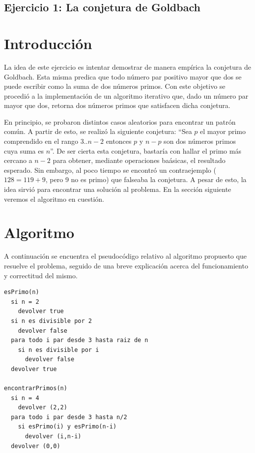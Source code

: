 \documentclass[a4paper,10pt] {article}
\begin{document}
\begin{center}
\section*{Ejercicio 1: La conjetura de Goldbach}
\end{center}

\bigskip
\section*{Introducci\'on}

La idea de este ejercicio es intentar demostrar de manera emp\'irica la
conjetura de Goldbach. Esta misma predica que todo n\'umero par positivo mayor
que dos se puede escribir como la suma de dos n\'umeros primos. Con este
objetivo se procedi\'o a la implementaci\'on de un algoritmo iterativo que, dado
un n\'umero par mayor que dos, retorna dos n\'umeros primos que satisfacen dicha
conjetura.

En principio, se probaron distintos casos aleatorios para encontrar un patr\'on
com\'un. A partir de esto, se realiz\'o la siguiente conjetura: ``Sea $p$ el mayor primo comprendido en el rango $3..n-2$ entonces $p$ y $n-p$ son dos n\'umeros primos cuya suma es $n$''. De ser cierta esta conjetura, bastar\'ia con hallar el primo m\'as cercano a $n-2$ para obtener, mediante operaciones ba\'asicas, el resultado esperado. Sin embargo, al poco tiempo se encontr\'o un contraejemplo ($128 = 119 + 9$, pero 9 no es primo) que falseaba la conjetura. A pesar de esto, la idea sirvi\'o para encontrar una soluci\'on al problema. En la secci\'on siguiente veremos el algoritmo en cuesti\'on.

\section*{Algoritmo}

A continuaci\'on se encuentra el pseudoc\'odigo relativo al algoritmo propuesto
que resuelve el problema, seguido de una breve explicaci\'on acerca del
funcionamiento y correctitud del mismo.

\begin{verbatim}
esPrimo(n)
  si n = 2 
    devolver true
  si n es divisible por 2
    devolver false
  para todo i par desde 3 hasta raiz de n
    si n es divisible por i
      devolver false
  devolver true

encontrarPrimos(n)
  si n = 4
    devolver (2,2)
  para todo i par desde 3 hasta n/2
    si esPrimo(i) y esPrimo(n-i)
      devolver (i,n-i)
  devolver (0,0)
\end{verbatim}
\end{document}
